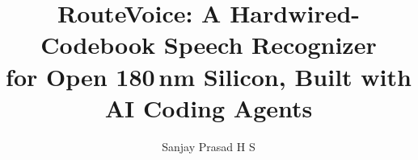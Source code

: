 \documentclass[10pt,twocolumn]{article}
\title{\textbf{RouteVoice}: A Hardwired-Codebook Speech Recognizer\\for Open 180\,nm Silicon, Built with AI Coding Agents}
\author{Sanjay Prasad H S}
\date{}
\begin{document}
\maketitle

















\clearpage
\onecolumn
\appendix

\end{document}
